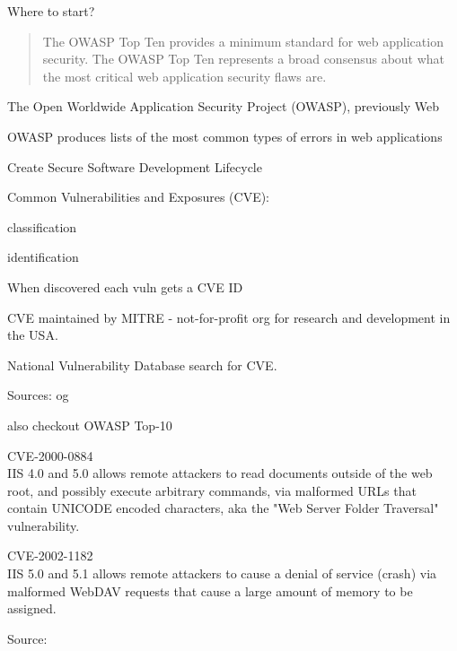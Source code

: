 \documentclass[Screen16to9,17pt]{foils}
\begin{document}
\vskip 2cm
\centerline{\LARGE Where to start?}



\begin{quote}
The OWASP Top Ten provides a minimum standard for web application
security. The OWASP Top Ten represents a broad consensus about what
the most critical web application security flaws are.
\end{quote}

\begin{list1}
\item The Open Worldwide Application Security Project (OWASP), previously Web
\item OWASP produces lists of the most common types of errors in web applications
\item {}
\item Create Secure Software Development Lifecycle
\end{list1}




\begin{list1}
\item Common Vulnerabilities and Exposures (CVE):
  \begin{list2}
  \item classification
  \item identification
  \end{list2}
\item When discovered each vuln gets a CVE ID
\item CVE maintained by MITRE - not-for-profit
org for research and development in the USA.
\item National Vulnerability Database search for CVE.
\item Sources:  og 
\item also checkout OWASP Top-10 
\end{list1}


\begin{list1}
\item \small CVE-2000-0884\\
IIS 4.0 and 5.0 allows remote attackers to read documents outside of
the web root, and possibly execute arbitrary commands, via malformed
URLs that contain UNICODE encoded characters, aka the "Web Server
Folder Traversal" vulnerability.

\item \small CVE-2002-1182\\
IIS 5.0 and 5.1 allows remote attackers to cause a denial of service
(crash) via malformed WebDAV requests that cause a large amount of
memory to be assigned.

\item Source:\\
\end{list1}
\end{document}
